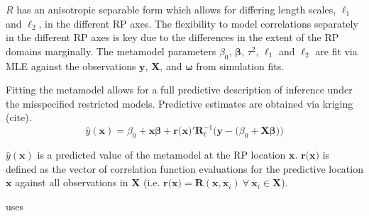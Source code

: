\documentclass[12pt]{article}
\begin{document}
$R$ has an anisotropic separable form which allows for differing length scales, 
$\ell_1$ and $\ell_2$, in the different RP axes. The flexibility to model 
correlations separately in the different RP axes is key due to the differences 
in the extent of the RP domains marginally. 
The metamodel parameters $\beta_0$, $\bm{\beta}$, $\tau^2$,
$\ell_1$ and $\ell_2$ are fit via MLE against the observations $\textbf{y}$, $\bm{X}$,
and $\bm{\omega}$ from simulation fits.

%
Fitting the metamodel allows for a full predictive description of inference 
under the misspecified restricted models.
Predictive estimates are obtained via kriging {(\color{red}cite)}. 
\begin{equation} %
	\hat y(\textbf{x}) = \beta_0 + \textbf{x}\bm{\beta} + \textbf{r(x)}'\bm{R}^{-1}_{\bm{\ell}}\Big(\textbf{y}-\big(\beta_0+\bm{X}\bm{\beta}\big)\Big)
\end{equation}

%
$\hat y(\textbf{x})$ is a predicted value of the metamodel at the 
RP location $\textbf{x}$. $\textbf{r(x)}$ is defined as the vector of correlation 
function evaluations for the predictive location $\textbf{x}$ against all observations 
in $\bm{X}$ (i.e. $\textbf{r(x)}=\bm{R}(\textbf{x}, \bm{x}_i)~\forall~\bm{x}_i\in\bm{X}$).

%
{\color{blue} uses}

%
%
%
%
%
%
%
%
\end{document}
